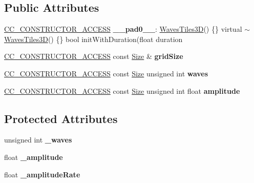 \subsection*{Public Attributes}
\begin{DoxyCompactItemize}
\item 
\mbox{\label{classWavesTiles3D_ae3252898abb6bc532e971babb9e54102}} 
\hyperlink{_2cocos2d_2cocos_2base_2ccConfig_8h_a25ef1314f97c35a2ed3d029b0ead6da0}{C\+C\+\_\+\+C\+O\+N\+S\+T\+R\+U\+C\+T\+O\+R\+\_\+\+A\+C\+C\+E\+SS} {\bfseries \+\_\+\+\_\+pad0\+\_\+\+\_\+}\+: \hyperlink{classWavesTiles3D}{Waves\+Tiles3D}() \{\} virtual $\sim$\hyperlink{classWavesTiles3D}{Waves\+Tiles3D}() \{\} bool init\+With\+Duration(float duration
\item 
\mbox{\label{classWavesTiles3D_a7f3c6d08c96e9a011115dd6a38ca1482}} 
\hyperlink{_2cocos2d_2cocos_2base_2ccConfig_8h_a25ef1314f97c35a2ed3d029b0ead6da0}{C\+C\+\_\+\+C\+O\+N\+S\+T\+R\+U\+C\+T\+O\+R\+\_\+\+A\+C\+C\+E\+SS} const \hyperlink{classSize}{Size} \& {\bfseries grid\+Size}
\item 
\mbox{\label{classWavesTiles3D_af62be96a53221b9855321d7061b55633}} 
\hyperlink{_2cocos2d_2cocos_2base_2ccConfig_8h_a25ef1314f97c35a2ed3d029b0ead6da0}{C\+C\+\_\+\+C\+O\+N\+S\+T\+R\+U\+C\+T\+O\+R\+\_\+\+A\+C\+C\+E\+SS} const \hyperlink{classSize}{Size} unsigned int {\bfseries waves}
\item 
\mbox{\label{classWavesTiles3D_a017d9a70365f3ebe1cc94fa3a825e7d3}} 
\hyperlink{_2cocos2d_2cocos_2base_2ccConfig_8h_a25ef1314f97c35a2ed3d029b0ead6da0}{C\+C\+\_\+\+C\+O\+N\+S\+T\+R\+U\+C\+T\+O\+R\+\_\+\+A\+C\+C\+E\+SS} const \hyperlink{classSize}{Size} unsigned int float {\bfseries amplitude}
\end{DoxyCompactItemize}
\subsection*{Protected Attributes}
\begin{DoxyCompactItemize}
\item 
\mbox{\label{classWavesTiles3D_ad255ddfed3dfe47a9e56b478dd91bf71}} 
unsigned int {\bfseries \+\_\+waves}
\item 
\mbox{\label{classWavesTiles3D_aabaa4be9b5d8cd5b02675e7f88bfccc7}} 
float {\bfseries \+\_\+amplitude}
\item 
\mbox{\label{classWavesTiles3D_a0d44933e4a5e14efff14f2f68df57bcc}} 
float {\bfseries \+\_\+amplitude\+Rate}
\end{DoxyCompactItemize}
